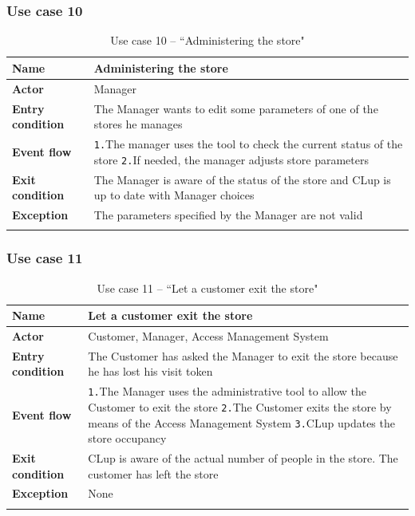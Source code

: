 \documentclass[a4paper,oneside,11pt]{book}   %
\begin{document}
    \subsubsection{Use case 10}
    \begin{longtable}[c] { |>{\bfseries{}}C{0.25\textwidth}|V{0.55\textwidth}| }
        \hline
        Name            & Administering the store \\ \hline
        Actor           & Manager \\ \hline
        Entry condition & The Manager wants to edit some parameters of one of the stores he manages \\ \hline
        Event flow      & 
        \texttt{1.}The manager uses the tool to check the current status of the store \newline
        \texttt{2.}If needed, the manager adjusts store parameters \newline \\ \hline
        Exit condition  & The Manager is aware of the status of the store and CLup is up to date with Manager choices \\ \hline
        Exception       & The parameters specified by the Manager are not valid \\
        \hline
    \caption{Use case 10 -- ``Administering the store"}
    \label{table:use_case_10}
    \end{longtable}
    
    \subsubsection{Use case 11}
    \begin{longtable}[c] { |>{\bfseries{}}C{0.25\textwidth}|V{0.55\textwidth}| }
        \hline
        Name            & Let a customer exit the store \\ \hline
        Actor           & Customer, Manager, Access Management System \\ \hline
        Entry condition & The Customer has asked the Manager to exit the store because he has lost his visit token \\ \hline
        Event flow      & 
        \texttt{1.}The Manager uses the administrative tool to allow the Customer to exit the store \newline
        \texttt{2.}The Customer exits the store by means of the Access Management System \newline
        \texttt{3.}CLup updates the store occupancy \\ \hline
        Exit condition  & CLup is aware of the actual number of people in the store. The customer has left the store \\ \hline
        Exception       & None \\
        \hline
    \caption{Use case 11 -- ``Let a customer exit the store"}
    \label{table:use_case_11}
    \end{longtable}
    
\end{document}
